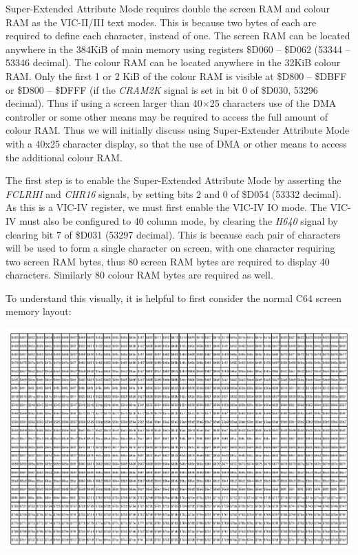 Super-Extended Attribute Mode requires double the screen RAM and colour RAM as the VIC-II/III text modes. This is because two bytes of each are required to define each character, instead of one.  The screen RAM can be located anywhere in the 384KiB of main memory using registers \$D060 -- \$D062 (53344 -- 53346 decimal).  The colour RAM can be located anywhere in the 32KiB colour RAM.  Only the first 1 or 2 KiB of the colour RAM is visible at \$D800 -- \$DBFF or \$D800 -- \$DFFF (if the {\em CRAM2K} signal is set in bit 0 of \$D030, 53296 decimal). Thus if using a screen larger than 40$\times$25 characters use of the DMA controller or some other means may be required to access the full amount of colour RAM.  Thus we will initially discuss using Super-Extender Attribute Mode with a 40x25 character display, so that the use of DMA or other means to access the additional colour RAM.

The first step is to enable the Super-Extended Attribute Mode by asserting the {\em FCLRHI} and {\em CHR16} signals, by setting bits 2 and 0 of \$D054 (53332 decimal).  As this is a VIC-IV register, we must first enable the VIC-IV IO mode.  The VIC-IV must also be configured to 40 column mode, by clearing the {\em H640} signal by clearing bit 7 of \$D031 (53297 decimal).  This is because each pair of characters will be used to form a single character on screen, with one character requiring two screen RAM bytes, thus 80 screen RAM bytes are required to display 40 characters.  Similarly 80 colour RAM bytes are required as well.

To understand this visually, it is helpful to first consider the normal C64 screen memory layout:

\includegraphics[width=\linewidth]{images/illustrations/screen-40x25-addresses.pdf}

